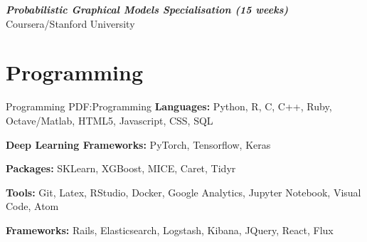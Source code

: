 \documentclass[letterpaper,10pt,oneside]{article}
\begin{document}
\begin{body}
\textbf{\textit{Probabilistic Graphical Models Specialisation (15 weeks)}} Coursera/Stanford University 
\hfill
{}


\section
{Programming}
{Programming}
{PDF:Programming}
\textbf{Languages:} Python, R, C, C++, Ruby, Octave/Matlab, HTML5, Javascript, CSS, SQL

\textbf{Deep Learning Frameworks:}  PyTorch, Tensorflow, Keras

\textbf{Packages:} SKLearn, XGBoost, MICE, Caret, Tidyr

\textbf{Tools:} Git, Latex, RStudio, Docker, Google Analytics, Jupyter Notebook, Visual Code, Atom

\textbf{Frameworks:} Rails, Elasticsearch, Logstash, Kibana, JQuery, React, Flux
\end{body}


\label{LastPage}~
\end{document}
